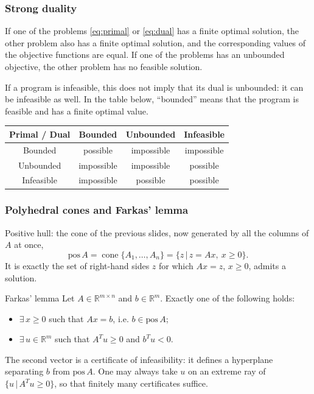 \documentclass[aspectratio=169]{beamer}
\providecommand{\red}{\color{red}}
\def\RR{\mathbb{R}}
\begin{document}
\begin{frame}
	\frametitle{Strong duality}
	
	If one of the problems \eqref{eq:primal} or \eqref{eq:dual} has a finite optimal solution, the other problem also has a finite optimal solution, and the corresponding values of the objective functions are equal.
	If one of the problems has an unbounded objective, the other problem has no feasible solution.

\mbox{}

If a program is infeasible, this does not imply that its dual is unbounded: it can be infeasible as well.
In the table below, ``bounded'' means that the program is feasible and has a finite optimal value.

\mbox{}

\begin{center}
	\begin{tabular}{|c||c|c|c|}
		\hline
		Primal / Dual & Bounded & Unbounded & Infeasible \\
		\hline
		\hline
		Bounded & possible & impossible & impossible \\
		\hline
		Unbounded & impossible & impossible & possible \\
		\hline
		Infeasible & impossible & possible & possible \\
		\hline
	\end{tabular}
\end{center}

\end{frame}

\begin{frame}
\frametitle{Polyhedral cones and Farkas' lemma}

{\red Positive hull}: the cone of the previous slides, now generated by {\red all} the columns of $A$ at once,
\[
\text{pos}\,A = \operatorname{cone}\lbrace A_1, \ldots, A_n \rbrace = \lbrace z \,|\, z = Ax,\ x \geq 0 \rbrace.
\]
It is exactly the set of right-hand sides $z$ for which $Ax = z$, $x \geq 0$, admits a solution.

\begin{block}{Farkas' lemma}
Let $A \in \RR^{m \times n}$ and $b \in \RR^m$. Exactly one of the following holds:
\begin{itemize}
	\item
	$\exists\, x \geq 0$ such that $Ax = b$, i.e. $b \in \text{pos}\,A$;
	\item
	$\exists\, u \in \RR^m$ such that $A^Tu \geq 0$ and $b^Tu < 0$.
\end{itemize}
\end{block}

The second vector is a {\red certificate of infeasibility}: it defines a hyperplane separating $b$ from $\text{pos}\,A$.
One may always take $u$ on an extreme ray of $\lbrace u \,|\, A^Tu \geq 0 \rbrace$, so that finitely many certificates suffice.

\end{frame}
\end{document}
